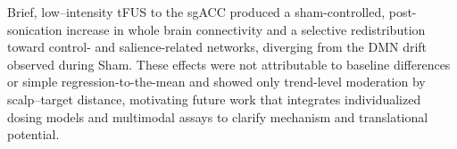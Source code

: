 Brief, low–intensity tFUS to the sgACC produced a sham-controlled, post-sonication increase in whole brain connectivity and a selective redistribution toward control- and salience-related networks, diverging from the DMN drift observed during Sham. These effects were not attributable to baseline differences or simple regression-to-the-mean and showed only trend-level moderation by scalp–target distance, motivating future work that integrates individualized dosing models and multimodal assays to clarify mechanism and translational potential.